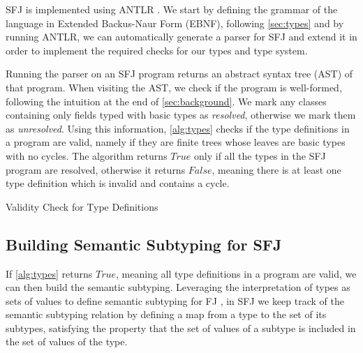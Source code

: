 \documentclass[runningheads]{llncs}
\begin{document}
SFJ is implemented using ANTLR \cite{parr2013}.
We start by defining the grammar of the language in Extended Backus-Naur Form (EBNF), following \autoref{sec:types} and by running ANTLR, we can automatically generate a parser for SFJ and extend it in order to implement the required checks for our types and type system.

Running the parser on an SFJ program returns an abstract syntax tree (AST) of that program.
When visiting the AST, we check if the program is well-formed, following the intuition at the end of \autoref{sec:background}.
We mark any classes containing only fields typed with basic types as \emph{resolved}, otherwise we mark them as \emph{unresolved}.
Using this information, \autoref{alg:types} checks if the type definitions in a program are valid, namely if they are finite trees whose leaves are basic types with no cycles.
%
The algorithm returns $True$ only if all the types in the SFJ program are resolved, otherwise it returns $False$, meaning there is at least one type definition which is invalid and contains a cycle.

\begin{algorithm}[t]
    \SetAlgoLined
    \caption{Validity Check for Type Definitions}
    \label{alg:types}

    \DontPrintSemicolon
    \BlankLine
\end{algorithm}

\subsection{Building Semantic Subtyping for SFJ}
\label{sec:subtypingAlgo}
If \autoref{alg:types} returns $True$, meaning all type definitions in a program are valid, we can then build the semantic subtyping.
Leveraging the interpretation of types as sets of values to define semantic subtyping for FJ \cite{Dardha2013,Dardha2017}, in SFJ we keep track of the semantic subtyping relation by defining a map from a type to the set of its subtypes, satisfying the property that the set of values of a subtype is included in the set of values of the type.
\end{document}
